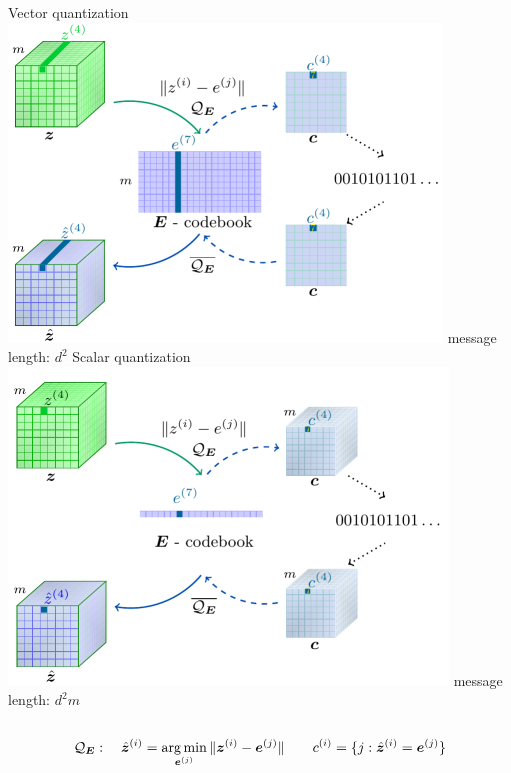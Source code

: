 \documentclass[smaller]{beamer}
\newcommand{\gQE}{\gQ_\mE}
\newcommand{\vzh}{\hat{\vz}}
\begin{document}

\begin{frame}[t]


\vskip 0.5cm

\begin{columns}[c]
\center
Vector quantization
\includegraphics[width=\textwidth]{Pics/quantization_half.png}
\small message length: \alert{$d^2$}
\center
Scalar quantization
\includegraphics[width=\textwidth]{Pics/quantization_scalar_half.png}
\small message length: \alert{$d^2 m$}

\end{columns}

\vskip 0.5cm

\[\gQE: \quad \vzh^{(i)} = \argmin_{\ve^{(j)}} \Vert \vz^{(i)} - \ve^{(j)} \Vert \qquad
\evc^{(i)} = \{j : \vzh^{(i)} = \ve^{(j)} \} \]



\end{frame}
\end{document}
